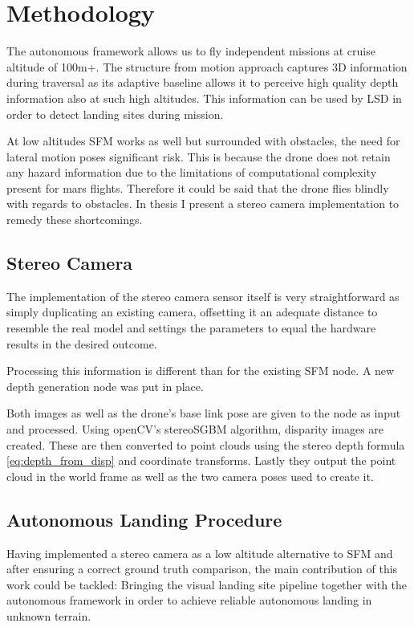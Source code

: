 \chapter{Methodology}
\label{sec:methodology}

The autonomous framework\citep{Autonomy} allows us to fly independent missions at cruise altitude of 100m+. The structure from motion approach captures 3D information during traversal as its adaptive baseline allows it to perceive high quality depth information also at such high altitudes. This information can be used by LSD in order to detect landing sites during mission. 

At low altitudes SFM works as well but surrounded with obstacles, the need for lateral motion poses significant risk. This is because the drone does not retain any hazard information due to the limitations of computational complexity present for mars flights. Therefore it could be said that the drone flies blindly with regards to obstacles. In thesis I present a stereo camera implementation to remedy these shortcomings.

\section{Stereo Camera}

The implementation of the stereo camera sensor itself is very straightforward as simply duplicating an existing camera, offsetting it an adequate distance to resemble the real model and settings the parameters to equal the hardware results in the desired outcome.

Processing this information is different than for the existing SFM node. A new depth generation node was put in place. 

Both images as well as the drone's base link pose are given to the node as input and processed. Using openCV's stereoSGBM algorithm, disparity images are created. These are then converted to point clouds using the stereo depth formula \ref{eq:depth_from_disp} and coordinate transforms. Lastly they output the point cloud in the world frame as well as the two camera poses used to create it.

\section{Autonomous Landing Procedure}

Having implemented a stereo camera as a low altitude alternative to SFM and after ensuring a correct ground truth comparison, the main contribution of this work could be tackled: Bringing the visual landing site pipeline together with the autonomous framework in order to achieve reliable autonomous landing in unknown terrain.

